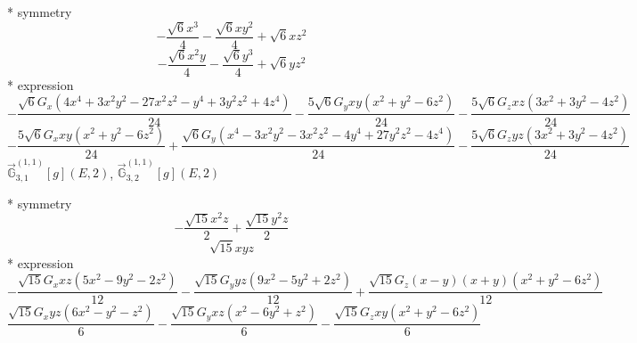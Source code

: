 \documentclass[fleqn,8pt]{jsarticle}
\begin{document}
\noindent\quad ** symmetry
\begin{dmath*}
- \frac{\sqrt{6} x^{3}}{4} - \frac{\sqrt{6} x y^{2}}{4} + \sqrt{6} x z^{2}
\end{dmath*}
\begin{dmath*}
- \frac{\sqrt{6} x^{2} y}{4} - \frac{\sqrt{6} y^{3}}{4} + \sqrt{6} y z^{2}
\end{dmath*}
\noindent\quad ** expression
\begin{dmath*}
- \frac{\sqrt{6} G_{x} \left(4 x^{4} + 3 x^{2} y^{2} - 27 x^{2} z^{2} - y^{4} + 3 y^{2} z^{2} + 4 z^{4}\right)}{24} - \frac{5 \sqrt{6} G_{y} x y \left(x^{2} + y^{2} - 6 z^{2}\right)}{24} - \frac{5 \sqrt{6} G_{z} x z \left(3 x^{2} + 3 y^{2} - 4 z^{2}\right)}{24}
\end{dmath*}
\begin{dmath*}
- \frac{5 \sqrt{6} G_{x} x y \left(x^{2} + y^{2} - 6 z^{2}\right)}{24} + \frac{\sqrt{6} G_{y} \left(x^{4} - 3 x^{2} y^{2} - 3 x^{2} z^{2} - 4 y^{4} + 27 y^{2} z^{2} - 4 z^{4}\right)}{24} - \frac{5 \sqrt{6} G_{z} y z \left(3 x^{2} + 3 y^{2} - 4 z^{2}\right)}{24}
\end{dmath*}
\noindent\quad $\vec{\mathbb{G}}_{3,1}^{(1,1)}[g](E,2)$, $\vec{\mathbb{G}}_{3,2}^{(1,1)}[g](E,2)$

\noindent\quad ** symmetry
\begin{dmath*}
- \frac{\sqrt{15} x^{2} z}{2} + \frac{\sqrt{15} y^{2} z}{2}
\end{dmath*}
\begin{dmath*}
\sqrt{15} x y z
\end{dmath*}
\noindent\quad ** expression
\begin{dmath*}
- \frac{\sqrt{15} G_{x} x z \left(5 x^{2} - 9 y^{2} - 2 z^{2}\right)}{12} - \frac{\sqrt{15} G_{y} y z \left(9 x^{2} - 5 y^{2} + 2 z^{2}\right)}{12} + \frac{\sqrt{15} G_{z} \left(x - y\right) \left(x + y\right) \left(x^{2} + y^{2} - 6 z^{2}\right)}{12}
\end{dmath*}
\begin{dmath*}
\frac{\sqrt{15} G_{x} y z \left(6 x^{2} - y^{2} - z^{2}\right)}{6} - \frac{\sqrt{15} G_{y} x z \left(x^{2} - 6 y^{2} + z^{2}\right)}{6} - \frac{\sqrt{15} G_{z} x y \left(x^{2} + y^{2} - 6 z^{2}\right)}{6}
\end{dmath*}
\end{document}
